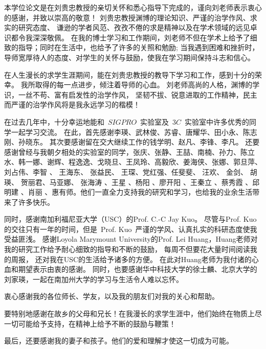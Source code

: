 \par 本学位论文是在刘贵忠教授的亲切关怀和悉心指导下完成的，谨向刘老师表示衷心的感谢，并致以崇高的敬意！
刘贵忠教授渊博的理论知识、严谨的治学作风、求实的研究态度、
谦逊的学者风范、孜孜不倦的求是精神以及在学术领域的远见卓识都令我深深敬佩。
在我的博士学习和工作期间，刘老师不但在学术上给予了细致的指导；同时在生活中，也给予了许多的关照和勉励;
当我遇到困难和挫折时，导师宽厚待人的态度、对学生的关怀与鼓励，使我在学习期间保持斗志和信心。

在人生漫长的求学生涯期间，能在刘贵忠教授的教导下学习和工作，感到十分的荣幸。
我所取得的每一点进步，倾注着导师的心血。
刘老师高尚的人格，渊博的学识，一丝不苟、富有启发性的治学作风，
坚韧不拔、锐意进取的工作精神，民主而严谨的治学作风将是我永远学习的楷模！

\par 在过去几年中，十分幸运地能和~$SIGPRO$~实验室及~$3C$~实验室中许多优秀的同学一起学习交流。
在此，首先感谢李瑛、武林俊、苏睿、唐耀华、田小永、陈志刚、孙晓东。
其次要感谢留在交大继续工作的钱学明、赵凡、李锋、李凡。
还要感谢曾经与我朝夕相处的实验室的同学，张庆、张静、王喆、南楠、孙力、陈立水、韩一娜、谢辉、程逸逸、戈晓旦、王凤玲、高毅欣、姜海侠、张娜、郭旦萍、刘占伟、李智 、 王海东、 张益民、 王琛、党红强、任斐斐、 汪欢、 金剑、 胡瑛、 贺丽君、马亚娜、 张海涛 、王星 、杨阳 、廖开阳 、王秦立 、蔡秀霞 、邱明建 、肖丽 、惠有师。他们一直全力支持我的研究和学习，也给我的业余生活带来了许多快乐。

\par 同时，感谢南加利福尼亚大学（USC）的Prof. C.-C Jay Kuo。
尽管与Prof. Kuo的交往只有一年的时间，但是~Prof. Kuo~严谨的学风、认真扎实的科研态度使我受益匪浅。
感谢Loyola Marymount University的Prof. Lei Huang，Huang老师对我的研究工作给予耐心细致的指导和不断的鼓励，
每周不但要花大量时间阅读我的周报，
还对我在USC的生活给予诸多的方便。
在此对Huang老师为我付诸的心血和期望表示由衷的感谢。
同时，也要感谢华中科技大学的徐士麟、北京大学的刘家瑛，一起在南加州大学的学习与生活令人难以忘怀。

\par 衷心感谢我的各位师长、学友，以及我的朋友们对我的关心和帮助。 
\par 要特别地感谢在故乡的父母和兄长！在我漫长的求学生涯中，他们始终在物质上尽一切可能给予支持，在精神上给予不断的鼓励与鞭策！

\par 最后，还要感谢我的妻子和孩子。他们的爱和理解才使这一切成为可能。
